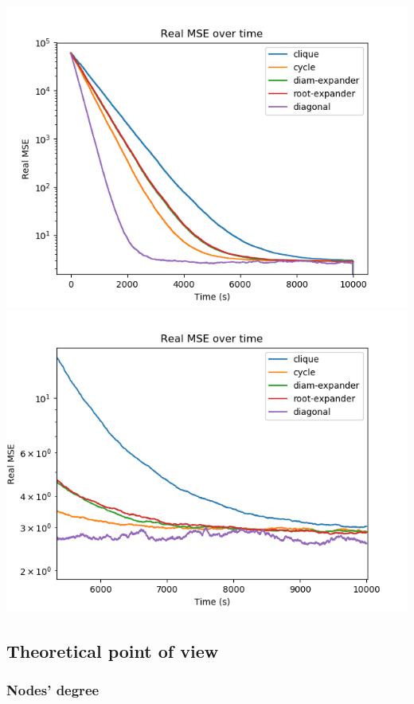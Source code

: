 \documentclass[11pt]{article}
\makeatletter
\def\maxwidth{\ifdim\Gin@nat@width>\linewidth\linewidth
    \else\Gin@nat@width\fi}
\let\Oldincludegraphics\includegraphics
\renewcommand{\includegraphics}[1]{\Oldincludegraphics[width=.8\maxwidth]{#1}}
\makeatother
\begin{document}
\includegraphics{media/img/tests/test_003_1ksamples_stochastic/3_real-mse_time.png}
\includegraphics{media/img/tests/test_003_1ksamples_stochastic/3_real-mse_time_zoom.png}

    \subsection{Theoretical point of view}\label{theoretical-point-of-view}

\subsubsection{Nodes' degree}\label{nodes-degree}
\end{document}
